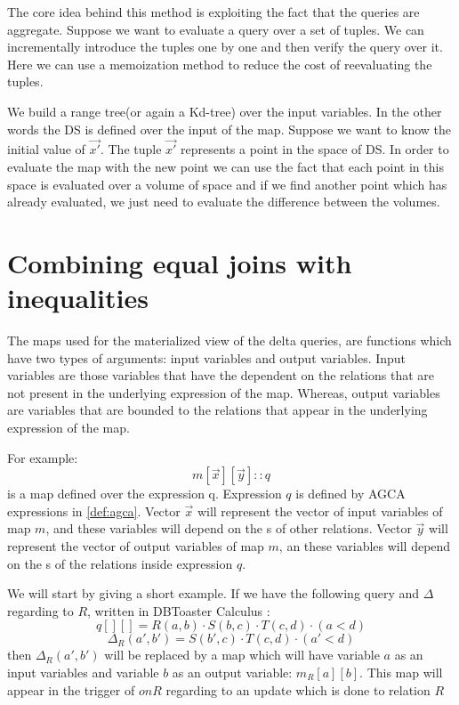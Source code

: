 \documentclass[12pt]{article}
\begin{document}
The core idea behind this method is exploiting the fact that the queries are aggregate. Suppose we want to evaluate a query over a set of tuples. We can incrementally introduce the tuples one by one and then verify the query over it. Here we can use a memoization method to reduce the cost of reevaluating the tuples. \par

We build a range tree(or again a Kd-tree) over the input variables. In the other words the DS is defined over the input of the map.
Suppose we want to know the initial value of $\vec{x'}$. The tuple $\vec{x'}$ represents a point in the space of DS. In order to evaluate the map with the new point we can use the fact that each point in this space is evaluated over a volume of space and if we find another point which has already evaluated, we just need to evaluate the difference between the volumes.

\section{Combining equal joins with inequalities}

The maps used for the materialized view of the delta queries, are functions which have two types of arguments: input variables and output variables. Input variables are those variables that have the \dom{} dependent on the relations that are not present in the underlying expression of the map. Whereas, output variables are variables that are bounded to the relations that appear in the underlying expression of the map.

For example:
$$m[\vec{x}][\vec{y}]::q$$
is a map defined over the expression q. Expression $q$ is defined by AGCA expressions in \ref{def:agca}. Vector $\vec{x}$ will represent the vector of input variables of map $m$, and these variables will depend on the \dom{}s of other relations. Vector $\vec{y}$ will represent the vector of output variables of map $m$, an these variables will depend on the \dom{}s of the relations inside expression $q$.

We will start by giving a short example. If we have the following query and $\Delta$ regarding to $R$, written in DBToaster Calculus \cite{1}:
$$q[][]=R(a,b)\cdot S(b,c)\cdot T(c,d)\cdot (a<d)$$
$$\Delta_R(a',b') = S(b',c)\cdot T(c,d)\cdot (a'<d)$$
then $\Delta_R(a',b')$ will be replaced by a map which will have variable $a$ as an input variables and variable $b$ as an output variable: $m_R[a][b]$. This map will appear in the trigger of $onR$ regarding to an update which is done to relation $R$
\end{document}
